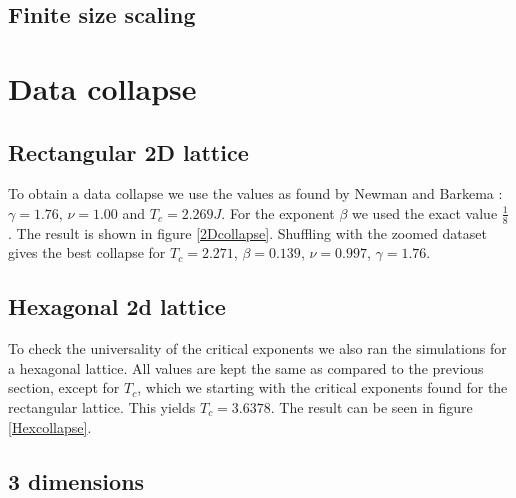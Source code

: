 \documentclass[11pt,twocolumn]{article}
\begin{document}
\subsection{Finite size scaling}
\section{Data collapse}
\subsection{Rectangular 2D lattice}
To obtain a data collapse we use the values as found by Newman and Barkema \cite{Thebook}: $\gamma = 1.76$, $\nu = 1.00$ and $T_c=2.269J$. For the exponent $\beta$ we used the exact value $\frac18$. The result is shown in figure \ref{2Dcollapse}. Shuffling with the zoomed dataset gives the best collapse for $T_c = 2.271$, $\beta =0.139$, $\nu =0.997$, $\gamma =1.76$.
\subsection{Hexagonal 2d lattice}
To check the universality of the critical exponents we also ran the simulations for a hexagonal lattice. All values are kept the same as compared to the previous section, except for $T_c$, which we starting with the critical exponents found for the rectangular lattice. This yields $T_c=3.6378$. The result can be seen in figure \ref{Hexcollapse}.
\subsection{3 dimensions}
{}

\end{document}
